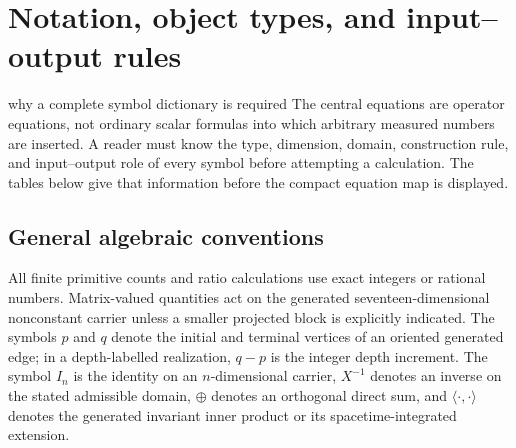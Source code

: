 \documentclass[11pt]{article}
\numberwithin{equation}{section}
\theoremstyle{remark}
\begin{document}
\section*{Notation, object types, and input--output rules}

\begin{interpretivebridge}{why a complete symbol dictionary is required}
The central equations are operator equations, not ordinary scalar formulas into which arbitrary measured numbers are inserted. A reader must know the type, dimension, domain, construction rule, and input--output role of every symbol before attempting a calculation. The tables below give that information before the compact equation map is displayed.
\end{interpretivebridge}

\subsection*{General algebraic conventions}
All finite primitive counts and ratio calculations use exact integers or rational numbers. Matrix-valued quantities act on the generated seventeen-dimensional nonconstant carrier unless a smaller projected block is explicitly indicated. The symbols $p$ and $q$ denote the initial and terminal vertices of an oriented generated edge; in a depth-labelled realization, $q-p$ is the integer depth increment. The symbol $I_n$ is the identity on an $n$-dimensional carrier, $X^{-1}$ denotes an inverse on the stated admissible domain, $\oplus$ denotes an orthogonal direct sum, and $\langle\cdot,\cdot\rangle$ denotes the generated invariant inner product or its spacetime-integrated extension.
\end{document}
